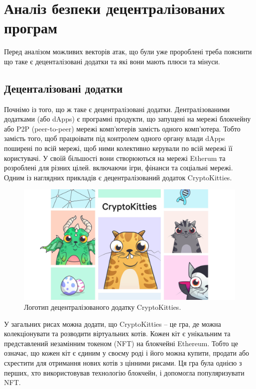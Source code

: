 \chapter{Аналіз безпеки децентралізованих програм}

Перед аналізом можливих векторів атак, що були уже пророблені треба пояснити що таке є деценталізовані додатки та які вони мають плюси та мінуси.

\section{Деценталізовані додатки}

Почнімо із того, що ж таке є децентралізовані додатки. Дентралізованими додатками (або dApps) є програмні продукти, що запущені на мережі блокчейну або P2P (peer-to-peer) мережі комп'ютерів замість одного комп'ютера. Тобто замість того, щоб працюівати під контролем одного органу влади dApps поширені по всій мережі, щоб ними колективно керували по всій мережі її користувачі.  У своїй більшості вони створюються на мережі Etherum та розроблені для різних цілей. включаючи ігри, фінанси та соціальні мережі. Одним із наглядних прикладів є децентралізований додаток CryptoKitties.

\begin{figure}[!h]
    		\centering
    		\includegraphics[scale = 0.3]{IMAGES/crypto_kitties.jpg}
    		\caption{Логотип децентралізованого додатку CryptoKitties.}
    		\label{fig:app_view_main_screen}
	\end{figure}

У загальних рисах можна додати, що CryptoKitties – це гра, де можна колекціонувати та розводити віртуальних котів. Кожен кіт є унікальним та представлений незамінним токеном (NFT) на блокчейні Ethereum. Тобто це означає, що кожен кіт є єдиним у своєму роді і його можна купити, продати або схрестити для отримання нових котів з цінними рисами. Ця гра була однією з перших, хто використовував технологію блокчейн, і допомогла популяризувати NFT. 

